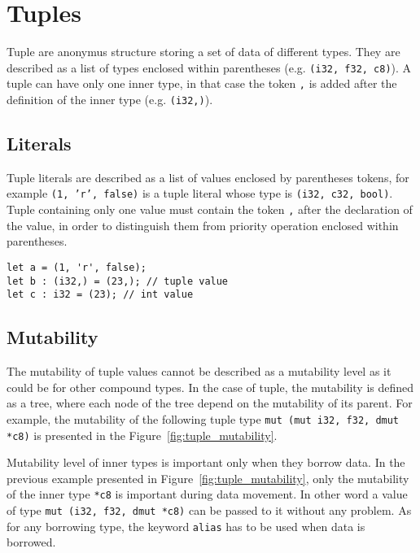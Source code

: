 \section {Tuples}


Tuple are anonymus structure storing a set of data of different types. They are
described as a list of types enclosed within parentheses (e.g. \texttt{(i32,
  f32, c8)}). A tuple can have only one inner type, in that case the token
\texttt{,} is added after the definition of the inner type (e.g.
\texttt{(i32,)}).

\subsection {Literals}

Tuple literals are described as a list of values enclosed by parentheses tokens,
for example \texttt{(1, 'r', false)} is a tuple literal whose type is
\texttt{(i32, c32, bool)}. Tuple containing only one value must contain the
token \texttt{,} after the declaration of the value, in order to distinguish
them from priority operation enclosed within parentheses.

\begin{lstlisting}[style=coloredverbatim]
let a = (1, 'r', false);
let b : (i32,) = (23,); // tuple value
let c : i32 = (23); // int value
\end{lstlisting}

\subsection {Mutability}
\label{sec:tuple_mutability}

The mutability of tuple values cannot be described as a mutability level as it
could be for other compound types. In the case of tuple, the mutability is
defined as a tree, where each node of the tree depend on the mutability of its
parent. For example, the mutability of the following tuple type \texttt{mut (mut
  i32, f32, dmut *c8)} is presented in the Figure~\ref{fig:tuple_mutability}.



Mutability level of inner types is important only when they borrow data. In the
previous example presented in Figure~\ref{fig:tuple_mutability}, only the
mutability of the inner type \texttt{*c8} is important during data movement. In
other word a value of type \texttt{mut (i32, f32, dmut *c8)} can be passed to it
without any problem. As for any borrowing type, the keyword \texttt{alias} has
to be used when data is borrowed.

